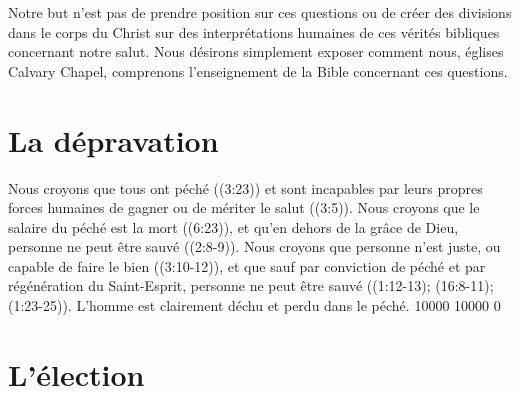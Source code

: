 
\begin{pocketpar}{}
Notre but n'est pas de prendre position sur ces questions
  ou de créer des
 divisions dans le corps du Christ
 sur des interprétations humaines de ces vérités bibliques
 concernant notre salut.
 Nous désirons simplement exposer comment nous,
 églises Calvary Chapel, comprenons l'en\-sei\-gnement de la Bible
 concernant ces questions.
\end{pocketpar}
 
\section*{La dépravation}

\begin{pocketpar}{}
Nous croyons que tous ont péché
 ((3:23)) et
 sont incapables par leurs propres forces humaines de gagner ou
 de mériter le salut ((3:5)).
 Nous croyons que le
 salaire du péché est la mort ((6:23)),
 et qu'en dehors de la grâce de Dieu, personne ne peut être sauvé
 ((2:8-9)).
 Nous cro\-yons que personne n'est juste, ou
 capable de faire le bien
 ((3:10-12)), et que sauf par
 conviction de péché et par régénération du Saint-Esprit, personne ne peut être sauvé
 ((1:12-13);
 (16:8-11);
 (1:23-25)).
 L'homme est clairement déchu et perdu dans le péché.
 \begingroup{} 10000 10000 0
 \par\endgroup
\end{pocketpar}


\section*{L'élection}

